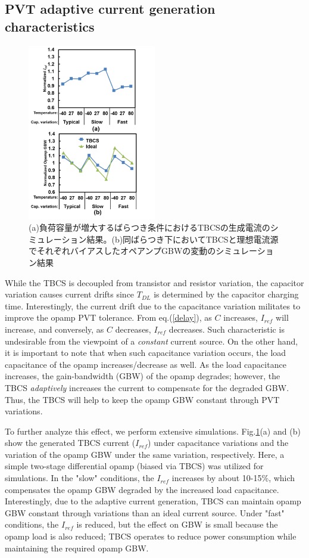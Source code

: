\documentclass[letterpaper, 10 pt, conference]{ieeeconf}  %
\begin{document}
\subsection{PVT adaptive current generation characteristics}
\begin{figure}[!]
\centering
 \includegraphics[width=0.5\textwidth]{figs/iref_var.png}
  \caption{(a)負荷容量が増大するばらつき条件におけるTBCSの生成電流のシミュレーション結果。(b)同ばらつき下においてTBCSと理想電流源でそれぞれバイアスしたオペアンプGBWの変動のシミュレーション結果}
\label{cvar}
\end{figure}

While the TBCS is decoupled from transistor and resistor variation, the capacitor variation causes current drifts since $T_{DL}$ is determined by the capacitor charging time. Interestingly, the current drift due to the capacitance variation militates to improve the opamp PVT tolerance.
From eq.(\ref{delay}), as $C$ increases, $I_{ref}$ will increase, and conversely, as $C$ decreases, $I_{ref}$ decreases. Such characteristic is undesirable from the viewpoint of a \textit{constant} current source. On the other hand, it is important to note that when such capacitance variation occurs, the load capacitance of the opamp increases/decrease as well. As the load capacitance increases, the gain-bandwidth (GBW) of the opamp degrades; however, the TBCS \textit{adaptively} increases the current to compensate for the degraded GBW. Thus, the TBCS will help to keep the opamp GBW constant through PVT variations.

To further analyze this effect, we perform extensive simulations. Fig.\ref{cvar}(a) and (b) show the generated TBCS current ($I_{ref}$) under capacitance variations and the variation of the opamp  GBW under the same variation, respectively. Here, a simple two-stage differential opamp (biased via TBCS) was utilized for simulations. In the "slow" conditions, the $I_{ref}$ increases by about 10-15\%, which compensates the opamp GBW degraded by the increased load capacitance. Interestingly, due to the adaptive current generation, TBCS can maintain opamp GBW constant through variations than an ideal current source. Under "fast" conditions, the $I_{ref}$ is reduced, but the effect on GBW is small because the opamp load is also reduced; TBCS operates to reduce power consumption while maintaining the required opamp GBW.
\end{document}
